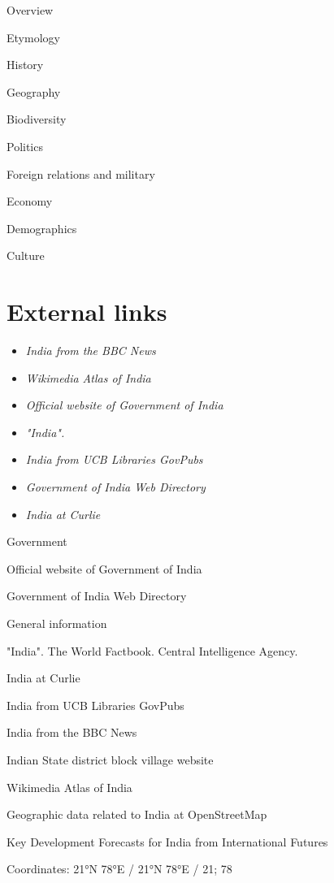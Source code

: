 Overview

Etymology

History

Geography

Biodiversity

Politics

Foreign relations and military

Economy

Demographics

Culture

\section{External links}\label{external-links}

\begin{itemize}
\item
  \emph{India from the BBC News}
\item
  \emph{Wikimedia Atlas of India}
\item
  \emph{Official website of Government of India}
\item
  \emph{"India".}
\item
  \emph{India from UCB Libraries GovPubs}
\item
  \emph{Government of India Web Directory}
\item
  \emph{India at Curlie}
\end{itemize}

Government

Official website of Government of India

Government of India Web Directory

General information

"India". The World Factbook. Central Intelligence Agency.

India at Curlie

India from UCB Libraries GovPubs

India from the BBC News

Indian State district block village website

Wikimedia Atlas of India

Geographic data related to India at OpenStreetMap

Key Development Forecasts for India from International Futures

Coordinates: 21°N 78°E﻿ / ﻿21°N 78°E﻿ / 21; 78
